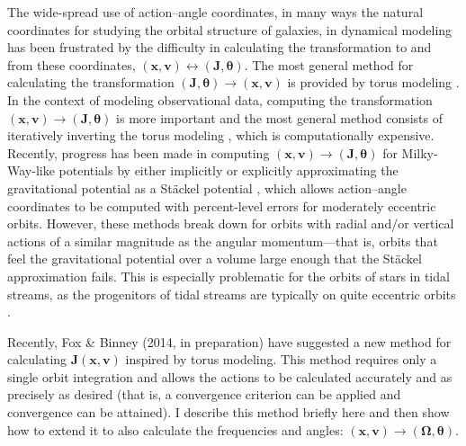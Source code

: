 \documentclass[12pt,preprint]{aastex}
\newcommand{\eg}{e.g.}
\renewcommand{\vec}[1]{\ensuremath{\mathbf{#1}}}
\newcommand{\vecx}{\ensuremath{\vec{x}}}
\newcommand{\vecv}{\ensuremath{\vec{v}}}
\newcommand{\vecj}{\ensuremath{\vec{J}}}
\newcommand{\veco}{\ensuremath{\vec{\Omega}}}
\newcommand{\veca}{\ensuremath{\boldsymbol\theta}}
\begin{document}
The wide-spread use of action--angle coordinates, in many ways the
natural coordinates for studying the orbital structure of galaxies, in
dynamical modeling has been frustrated by the difficulty in
calculating the transformation to and from these coordinates,
$(\vecx,\vecv) \leftrightarrow (\vecj,\veca)$. The most general method
for calculating the transformation $(\vecj,\veca) \rightarrow
(\vecx,\vecv)$ is provided by torus modeling \citep{McGill90a}. In the
context of modeling observational data, computing the transformation
$(\vecx,\vecv) \rightarrow (\vecj,\veca)$ is more important and the
most general method consists of iteratively inverting the torus
modeling \citep{McMillan08a}, which is computationally
expensive. Recently, progress has been made in computing
$(\vecx,\vecv) \rightarrow (\vecj,\veca)$ for Milky-Way-like
potentials by either implicitly or explicitly approximating the
gravitational potential as a St\"{a}ckel potential
\citep{Binney12a,Sanders12a}, which allows action--angle coordinates
to be computed with percent-level errors for moderately eccentric
orbits. However, these methods break down for orbits with radial
and/or vertical actions of a similar magnitude as the angular
momentum---that is, orbits that feel the gravitational potential over
a volume large enough that the St\"{a}ckel approximation fails. This
is especially problematic for the orbits of stars in tidal streams, as
the progenitors of tidal streams are typically on quite eccentric
orbits \citep[\eg,][]{Sanders13a}.

Recently, Fox \& Binney (2014, in preparation) have suggested a new
method for calculating $\vecj(\vecx,\vecv)$ inspired by torus
modeling. This method requires only a single orbit integration and
allows the actions to be calculated accurately and as precisely as
desired (that is, a convergence criterion can be applied and
convergence can be attained). I describe this method briefly here and
then show how to extend it to also calculate the frequencies and
angles: $(\vecx,\vecv) \rightarrow (\veco,\veca)$.
\end{document}
